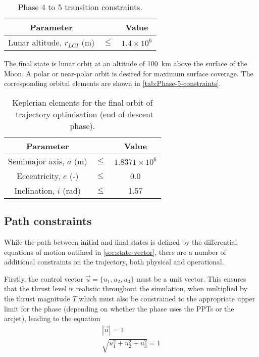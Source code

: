 \begin{table}[h]
\caption{Phase 4 to 5 transition constraints.} \label{tab:Phase-4-5-constraints}
\centering
\begin{tabular} {ccc}\toprule
Parameter && Value\\\midrule
Lunar altitude, $r_{LCI}$ (m) &$\le$& $1.4\times 10^6$\\\bottomrule
\end{tabular}
\end{table}

The final state is lunar orbit at an altitude of 100~km above the surface of the Moon. A polar or near-polar orbit is desired for maximum surface coverage. The corresponding orbital elements are shown in \autoref{tab:Phase-5-constraints}.

\begin{table}[h]
\caption{Keplerian elements for the final orbit of \BW\ trajectory optimisation (end of descent phase).} \label{tab:Phase-5-constraints}
\centering
\begin{tabular} {ccc}\toprule
Parameter && Value\\\midrule
Semimajor axis, $a$ (m) &$\le$& $1.8371\times 10^6$\\
Eccentricity, $e$ (-) &$\le$& 0.0\\
Inclination, $i$ (rad) &$\le$& 1.57\\\bottomrule
\end{tabular}
\end{table}

\subsection{Path constraints} \label{sub:Path-constraints}

While the path between initial and final states is defined by the differential equations of motion outlined in \autoref{sec:state-vector}, there are a number of additional constraints on the trajectory, both physical and operational.

Firstly, the control vector $\vec{u}=\{u_1,u_2,u_3\}$ must be a unit vector. This ensures that the thrust level is realistic throughout the simulation, when multiplied by the thrust magnitude $T$ which must also be constrained to the appropriate upper limit for the phase (depending on whether the phase uses the PPTs or the arcjet), leading to the equation
\begin{subequations}
\begin{gather}
|\vec{u}|=1 \\
\sqrt{u_1^2+u_2^2+u_3^2}=1
\end{gather}
\end{subequations}


